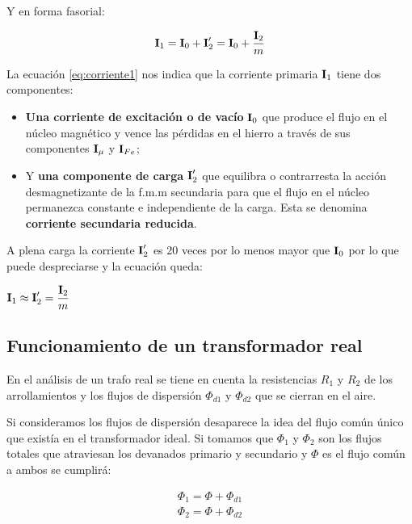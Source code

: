 Y en forma fasorial: 

\begin{equation}
	\fasor{i}_1 = \fasor{i}_0 + \fasor{i}_2' = \fasor{i}_0 + \dfrac{\fasor{i}_2}{m}
	\label{eq:corriente1}
\end{equation}

La ecuación \ref{eq:corriente1} nos indica que la corriente primaria $\fasor{i}_{1}$ tiene dos componentes:

\begin{itemize}
	\item \textbf{Una corriente de excitación o de vacío} $\fasor{i}_0$ que produce el flujo en el núcleo magnético y vence las pérdidas en el hierro a través de sus componentes $\fasor{i}_{\mu}$ y $\fasor{i}_{Fe}$;
	\item Y \textbf{una componente de carga} $\fasor{i}_2'$ que equilibra o contrarresta la acción desmagnetizante de la f.m.m secundaria para que el flujo en el núcleo permanezca constante e independiente de la carga. Esta se denomina \textbf{corriente secundaria reducida}.
\end{itemize}

A plena carga la corriente $\fasor{i}_2'$ es 20 veces por lo menos mayor que $\fasor{i}_0$ por lo que puede despreciarse y la ecuación queda:

\begin{center}
	$\fasor{i}_1 \approx \fasor{i}_2' = \dfrac{\fasor{i}_2}{m}$
\end{center}

\subsection{Funcionamiento de un transformador real}

En el análisis de un trafo real se tiene en cuenta la resistencias $R_{1}$ y $R_{2}$ de los arrollamientos y los flujos de dispersión $\Phi_{d1}$ y $\Phi_{d2}$ que se cierran en el aire.

Si consideramos los flujos de dispersión desaparece la idea del flujo común único que existía en el transformador ideal. Si tomamos que $\Phi_{1}$ y $\Phi_{2}$ son los flujos totales que atraviesan los devanados primario y secundario y $\Phi$ es el flujo común a ambos se cumplirá:

\begin{equation*}
	\begin{split}
		\Phi_1 = \Phi + \Phi_{d1} \\
		\Phi_2 = \Phi + \Phi_{d2}
	\end{split}
\end{equation*}

